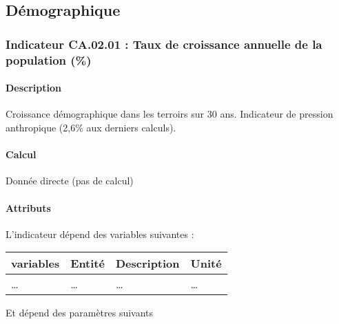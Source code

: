 \documentclass[
]{article}
\newenvironment{Shaded}{\begin{snugshade}}{\end{snugshade}}
\newcommand{\NormalTok}[1]{#1}
\begin{document}
\subsection{Démographique}\label{duxe9mographique}

\subsubsection{Indicateur CA.02.01 : Taux de croissance annuelle de la
population
(\%)}\label{indicateur-ca.02.01-taux-de-croissance-annuelle-de-la-population}

\paragraph{Description}\label{description-18}

Croissance démographique dans les terroirs sur 30 ans. Indicateur de
pression anthropique (2,6\% aux derniers calculs).

\paragraph{Calcul}\label{calcul-18}

\begin{Shaded}
\begin{Highlighting}[]
\NormalTok{Donnée directe (pas de calcul)}
\end{Highlighting}
\end{Shaded}

\paragraph{Attributs}\label{attributs-36}

L'indicateur dépend des variables suivantes :

\begin{longtable}[]{@{}llll@{}}
\toprule\noalign{}
\textbf{variables} & \textbf{Entité} & \textbf{Description} &
\textbf{Unité} \\
\midrule\noalign{}
\endhead
\bottomrule\noalign{}
\endlastfoot
\ldots{} & \ldots{} & \ldots{} & \ldots{} \\
\end{longtable}

Et dépend des paramètres suivants
\end{document}
